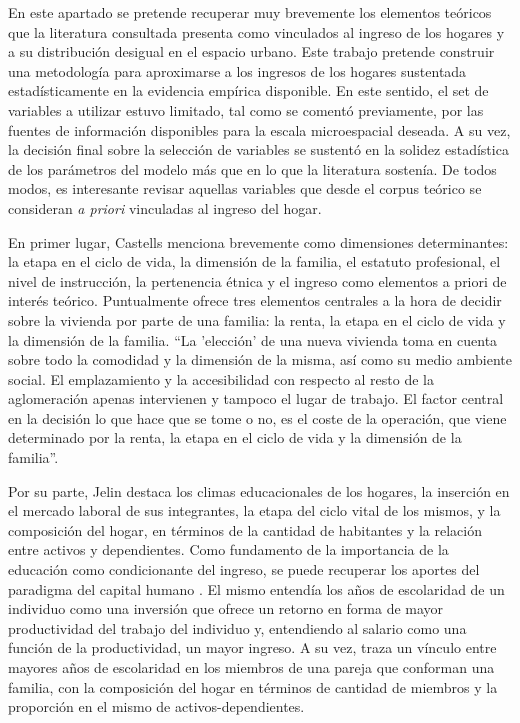 En este apartado se pretende recuperar muy brevemente los elementos teóricos que la literatura consultada presenta como vinculados al ingreso de los hogares y a su distribución desigual en el espacio urbano. Este trabajo pretende construir una metodología para aproximarse a los ingresos de los hogares sustentada estadísticamente en la evidencia empírica disponible. En este sentido, el set de variables a utilizar estuvo limitado, tal como se comentó previamente, por las fuentes de información disponibles para la escala microespacial deseada. A su vez, la decisión final sobre la selección de variables se sustentó en la solidez estadística de los parámetros del modelo más que en lo que la literatura sostenía. De todos modos, es interesante revisar aquellas variables que desde el corpus teórico se consideran \textit{a priori} vinculadas al ingreso del hogar. 

En primer lugar, Castells \citeyear{castells} menciona brevemente como dimensiones determinantes: la etapa en el ciclo de vida, la dimensión de la familia, el estatuto profesional, el nivel de instrucción, la pertenencia étnica y el ingreso como elementos a priori de interés teórico. Puntualmente ofrece tres elementos centrales a la hora de decidir sobre la vivienda por parte de una familia: la renta, la etapa en el ciclo de vida y la dimensión de la familia. “La 'elección' de una nueva vivienda toma en cuenta sobre todo la comodidad y la dimensión de la misma, así como su medio ambiente social. El emplazamiento y la accesibilidad con respecto al resto de la aglomeración apenas intervienen y tampoco el lugar de trabajo. El factor central en la decisión lo que hace que se tome o no, es el coste de la operación, que viene determinado por la renta, la etapa en el ciclo de vida y la dimensión de la familia”\cite[p.~215]{castells}.
	
Por su parte, Jelin \citeyear{jelin} destaca los climas educacionales de los hogares, la inserción en el mercado laboral de sus integrantes, la etapa del ciclo vital de los mismos, y la composición del hogar, en términos de la cantidad de habitantes y la relación entre activos y dependientes. Como fundamento de la importancia de la educación como condicionante del ingreso, se puede recuperar los aportes del paradigma del capital humano \cite{mincer,beckar,schultz1961,schultz1962}. El mismo entendía los años de escolaridad de un individuo como una inversión que ofrece un retorno en forma de mayor productividad del trabajo del individuo y, entendiendo al salario como una función de la productividad, un mayor ingreso. A su vez, traza un vínculo entre mayores años de escolaridad en los miembros de una pareja que conforman una familia, con la composición del hogar en términos de cantidad de miembros y la proporción en el mismo de activos-dependientes. 

